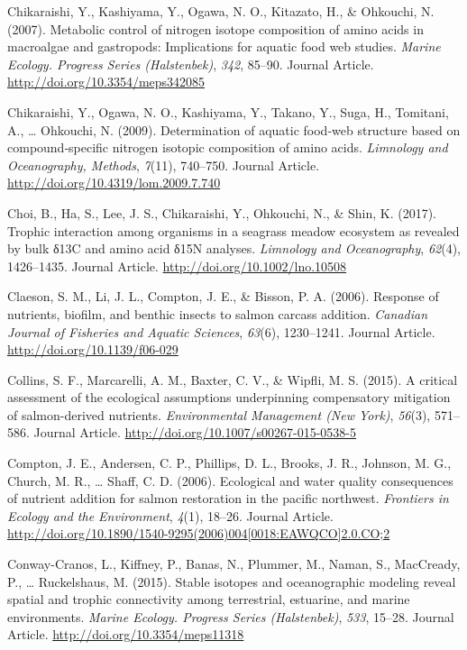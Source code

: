 \documentclass [11pt, proquest] {uwthesis}[2015/03/03]
\begin{document}
\hypertarget{ref-Chikaraishi2007}{}
Chikaraishi, Y., Kashiyama, Y., Ogawa, N. O., Kitazato, H., \& Ohkouchi,
N. (2007). Metabolic control of nitrogen isotope composition of amino
acids in macroalgae and gastropods: Implications for aquatic food web
studies. \emph{Marine Ecology. Progress Series (Halstenbek)},
\emph{342}, 85--90. Journal Article.
\url{http://doi.org/10.3354/meps342085}

\hypertarget{ref-Chikaraishi2009}{}
Chikaraishi, Y., Ogawa, N. O., Kashiyama, Y., Takano, Y., Suga, H.,
Tomitani, A., \ldots{} Ohkouchi, N. (2009). Determination of aquatic
food‐web structure based on compound‐specific nitrogen isotopic
composition of amino acids. \emph{Limnology and Oceanography, Methods},
\emph{7}(11), 740--750. Journal Article.
\url{http://doi.org/10.4319/lom.2009.7.740}

\hypertarget{ref-Choi2017}{}
Choi, B., Ha, S., Lee, J. S., Chikaraishi, Y., Ohkouchi, N., \& Shin, K.
(2017). Trophic interaction among organisms in a seagrass meadow
ecosystem as revealed by bulk δ13C and amino acid δ15N analyses.
\emph{Limnology and Oceanography}, \emph{62}(4), 1426--1435. Journal
Article. \url{http://doi.org/10.1002/lno.10508}

\hypertarget{ref-Claeson2006}{}
Claeson, S. M., Li, J. L., Compton, J. E., \& Bisson, P. A. (2006).
Response of nutrients, biofilm, and benthic insects to salmon carcass
addition. \emph{Canadian Journal of Fisheries and Aquatic Sciences},
\emph{63}(6), 1230--1241. Journal Article.
\url{http://doi.org/10.1139/f06-029}

\hypertarget{ref-Collins2015}{}
Collins, S. F., Marcarelli, A. M., Baxter, C. V., \& Wipfli, M. S.
(2015). A critical assessment of the ecological assumptions underpinning
compensatory mitigation of salmon-derived nutrients. \emph{Environmental
Management (New York)}, \emph{56}(3), 571--586. Journal Article.
\url{http://doi.org/10.1007/s00267-015-0538-5}

\hypertarget{ref-Compton2006}{}
Compton, J. E., Andersen, C. P., Phillips, D. L., Brooks, J. R.,
Johnson, M. G., Church, M. R., \ldots{} Shaff, C. D. (2006). Ecological
and water quality consequences of nutrient addition for salmon
restoration in the pacific northwest. \emph{Frontiers in Ecology and the
Environment}, \emph{4}(1), 18--26. Journal Article.
\href{http://doi.org/10.1890/1540-9295(2006)004\%5B0018:EAWQCO\%5D2.0.CO;2}{http://doi.org/10.1890/1540-9295(2006)004{[}0018:EAWQCO{]}2.0.CO;2}

\hypertarget{ref-Conway2015}{}
Conway-Cranos, L., Kiffney, P., Banas, N., Plummer, M., Naman, S.,
MacCready, P., \ldots{} Ruckelshaus, M. (2015). Stable isotopes and
oceanographic modeling reveal spatial and trophic connectivity among
terrestrial, estuarine, and marine environments. \emph{Marine Ecology.
Progress Series (Halstenbek)}, \emph{533}, 15--28. Journal Article.
\url{http://doi.org/10.3354/meps11318}
\end{document}
